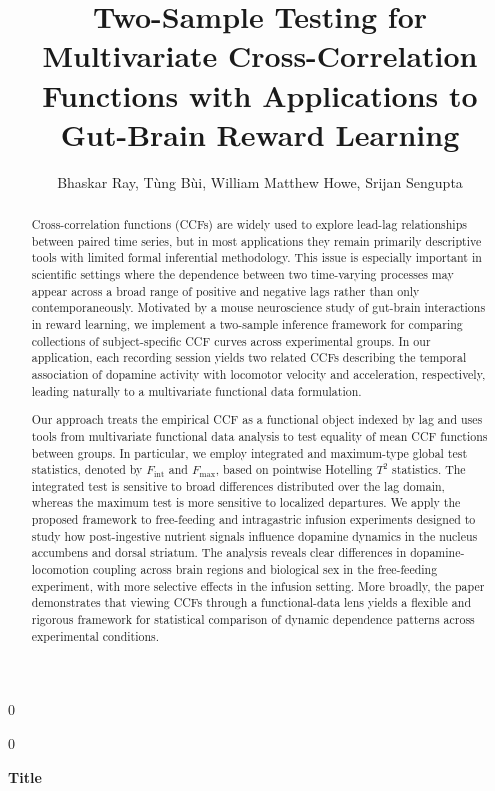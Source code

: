 \documentclass[12pt]{article}
\newcommand{\blind}{0}
\begin{document}
\def\spacingset#1{\renewcommand{\baselinestretch}%
{#1}\small\normalsize} \spacingset{1}



\blind
{
  \title{\bf Two-Sample Testing for Multivariate Cross-Correlation Functions with Applications to Gut-Brain Reward Learning}
  \author{Bhaskar Ray, 
Tùng Bùi, William Matthew Howe, Srijan Sengupta}
  \maketitle
} \fi

\blind
{
  \bigskip
  \bigskip
  \bigskip
  \begin{center}
    {\LARGE\bf Title}
\end{center}
  \medskip
} \fi

\begin{abstract}
Cross-correlation functions (CCFs) are widely used to explore lead-lag relationships between paired time series, but in most applications they remain primarily descriptive tools with limited formal inferential methodology. This issue is especially important in scientific settings where the dependence between two time-varying processes may appear across a broad range of positive and negative lags rather than only contemporaneously. Motivated by a mouse neuroscience study of gut-brain interactions in reward learning, we implement a two-sample inference framework for comparing collections of subject-specific CCF curves across experimental groups. In our application, each recording session yields two related CCFs describing the temporal association of dopamine activity with locomotor velocity and acceleration, respectively, leading naturally to a multivariate functional data formulation.

Our approach treats the empirical CCF as a functional object indexed by lag and uses tools from multivariate functional data analysis to test equality of mean CCF functions between groups. In particular, we employ integrated and maximum-type global test statistics, denoted by \(F_{\mathrm{int}}\) and \(F_{\max}\), based on pointwise Hotelling \(T^2\) statistics. The integrated test is sensitive to broad differences distributed over the lag domain, whereas the maximum test is more sensitive to localized departures. We apply the proposed framework to free-feeding and intragastric infusion experiments designed to study how post-ingestive nutrient signals influence dopamine dynamics in the nucleus accumbens and dorsal striatum. The analysis reveals clear differences in dopamine-locomotion coupling across brain regions and biological sex in the free-feeding experiment, with more selective effects in the infusion setting. More broadly, the paper demonstrates that viewing CCFs through a functional-data lens yields a flexible and rigorous framework for statistical comparison of dynamic dependence patterns across experimental conditions.
\end{abstract}
\bigskip
\end{document}
